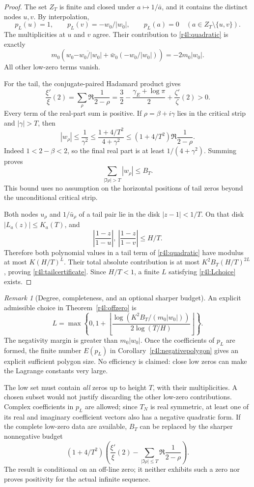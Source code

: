 \documentclass[11pt,a4paper]{article}
\theoremstyle{definition}\newtheorem{definition}[theorem]{Definition}
\theoremstyle{remark}\newtheorem{remark}[theorem]{Remark}
\numberwithin{equation}{section}
\begin{document}
\begin{proof}
The set $Z_T$ is finite and closed under $a\mapsto1/\bar a$, and it
contains the distinct nodes $u,v$.  By interpolation,
\[
 p_L(u)=1,\qquad p_L(v)=-w_0/|w_0|,
 \qquad p_L(a)=0\quad(a\in Z_T\setminus\{u,v\}).
\]
The multiplicities at $u$ and $v$ agree.  Their contribution to
\eqref{r4l:quadratic} is exactly
\[
 m_0\left(w_0\overline{-w_0/|w_0|}
           +\bar w_0(-w_0/|w_0|)\right)
 =-2m_0|w_0|.
\]
All other low-zero terms vanish.

For the tail, the conjugate-paired Hadamard product gives
\begin{equation}\label{r4l:A2}
 \frac{\xi'}{\xi}(2)
 =\sum_\rho\Re\frac1{2-\rho}
 =\frac32-\frac{\gamma_E+\log\pi}{2}
                 +\frac{\zeta'}{\zeta}(2)>0.
\end{equation}
Every term of the real-part sum is positive.  If
$\rho=\beta+i\gamma$ lies in the critical strip and $|\gamma|>T$, then
\[
 |w_\rho|\le\frac1{\gamma^2}
 \le\frac{1+4/T^2}{4+\gamma^2}
 \le(1+4/T^2)\Re\frac1{2-\rho}.
\]
Indeed $1<2-\beta<2$, so the final real part is at least
$1/(4+\gamma^2)$.  Summing proves
\[
 \sum_{|\Im\rho|>T}|w_\rho|\le B_T.
\]
This bound uses no assumption on the horizontal positions of tail
zeros beyond the unconditional critical strip.

Both nodes $u_\rho$ and $1/\bar u_\rho$ of a tail pair lie in the
disk $|z-1|<1/T$.  On that disk $|L_a(z)|\le K_a(T)$, and
\[
 \left|\frac{1-z}{1-u}\right|,
 \ \left|\frac{1-z}{1-v}\right|\le H/T.
\]
Therefore both polynomial values in a tail term of
\eqref{r4l:quadratic} have modulus at most $K(H/T)^L$.  Their total
absolute contribution is at most $K^2B_T(H/T)^{2L}$, proving
\eqref{r4l:tailcertificate}.  Since $H/T<1$, a finite $L$ satisfying
\eqref{r4l:Lchoice} exists.
\end{proof}

\begin{remark}[Degree, completeness, and an optional sharper budget]
\label{r4l:certificatescope}
An explicit admissible choice in Theorem~\ref{r4l:offzero} is
\[
 L=\max\left\{0,
 1+\left\lfloor
 \frac{\log(K^2B_T/(m_0|w_0|))}{2\log(T/H)}
 \right\rfloor\right\}.
\]
The negativity margin is greater than $m_0|w_0|$.  Once the coefficients
of $p_L$ are formed, the finite number $E(p_L)$ in
Corollary~\ref{r4l:negativepolygon} gives an explicit sufficient polygon
size.  No efficiency is claimed: close low zeros can make the
Lagrange constants very large.

The low set must contain \emph{all} zeros up to height $T$, with their
multiplicities.  A chosen subset would not justify discarding the
other low-zero contributions.  Complex coefficients in $p_L$ are
allowed; since $T_N$ is real symmetric, at least one of its real and
imaginary coefficient vectors also has a negative quadratic form.
If the complete low-zero data are available, $B_T$ can be replaced by
the sharper nonnegative budget
\[
 (1+4/T^2)\left(
 \frac{\xi'}{\xi}(2)-
 \sum_{|\Im\rho|\le T}\Re\frac1{2-\rho}\right).
\]
The result is conditional on an off-line zero; it neither exhibits
such a zero nor proves positivity for the actual infinite sequence.
\end{remark}
\end{document}
